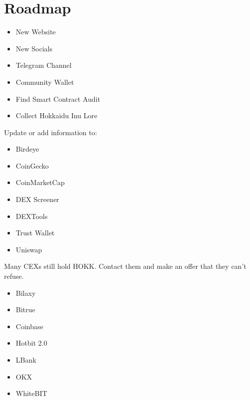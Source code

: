 \documentclass{article}
\begin{document}
\section{Roadmap}
\begin{tcolorbox}[colback=salmon1!10!white,colframe=pink1,
  title=Phase 1: Revive the Legend (\textit{Complete}),
  fonttitle=\bfseries]
  \begin{itemize}
  \item New Website
  \item New Socials
  \item Telegram Channel
  \item Community Wallet
  \end{itemize}
\end{tcolorbox}
\begin{tcolorbox}[colback=salmon1!10!white,colframe=pink1,
  title=Phase 2: Search the Past (\textit{Complete}),
  fonttitle=\bfseries]
  \begin{itemize}
  \item Find Smart Contract Audit
  \item Collect Hokkaidu Inu Lore
  \end{itemize}
\end{tcolorbox}
\begin{tcolorbox}[colback=salmon1!10!white,colframe=salmon2,
  title=Phase 3: Build Momentum (\textit{In Progess}),
  fonttitle=\bfseries]
  Update or add information to:
  \begin{itemize}
  \item Birdeye
  \item CoinGecko
  \item CoinMarketCap
  \item DEX Screener
  \item DEXTools
  \item Trust Wallet
  \item Uniswap
  \end{itemize}
\end{tcolorbox}
\begin{tcolorbox}[colback=salmon1!10!white,colframe=salmon1,
  title=Phase 4: Gather Forces,
  fonttitle=\bfseries]
  Many CEXs still hold HOKK. Contact them and make an offer that they can't refuse.
  \begin{itemize}
  \item Bilaxy
  \item Bitrue
  \item Coinbase
  \item Hotbit 2.0
  \item LBank
  \item OKX
  \item WhiteBIT
  \end{itemize}
\end{tcolorbox}
\end{document}
